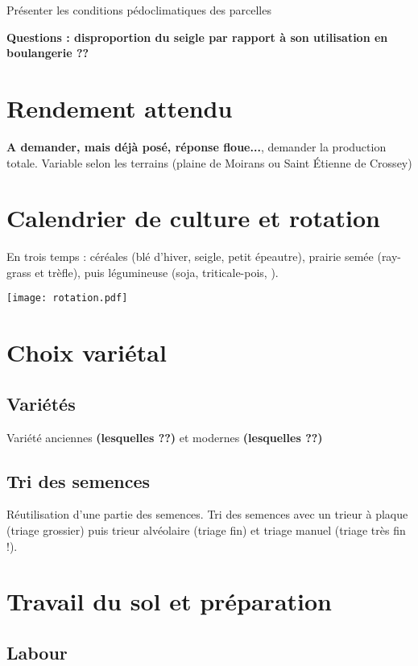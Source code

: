 \documentclass{article}
\begin{document}
Présenter les conditions pédoclimatiques des parcelles

\textbf{Questions : disproportion du seigle par rapport à son utilisation en boulangerie ??}

\section{Rendement attendu}

\textbf{A demander, mais déjà posé, réponse floue...}, demander la production totale. Variable selon les terrains (plaine de Moirans ou Saint Étienne de Crossey)

\section{Calendrier de culture et rotation}

En trois temps : céréales (blé d'hiver, seigle, petit épeautre), prairie semée (ray-grass et trèfle), puis légumineuse (soja, triticale-pois, ).

\begin{center}
	\texttt{[image: rotation.pdf]}
\end{center}

\section{Choix variétal}

\subsection{Variétés}

Variété anciennes\textbf{ (lesquelles ??)} et modernes \textbf{(lesquelles ??)}

\subsection{Tri des semences}

Réutilisation d'une partie des semences. Tri des semences avec un trieur à plaque (triage grossier) puis trieur alvéolaire (triage fin) et triage manuel (triage très fin !). 

\section{Travail du sol et préparation}

\subsection{Labour}
\end{document}
